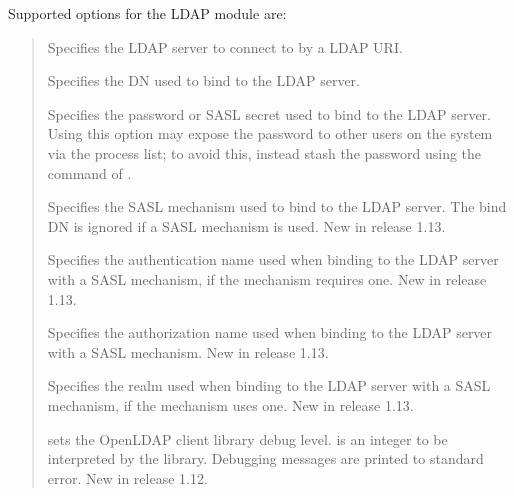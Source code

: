 \documentclass[letterpaper,10pt,english]{sphinxmanual}
\begin{document}
\sphinxAtStartPar
Supported options for the LDAP module are:
\begin{quote}
\begin{description}
\sphinxAtStartPar
Specifies the LDAP server to connect to by a LDAP URI.

\sphinxAtStartPar
Specifies the DN used to bind to the LDAP server.

\sphinxAtStartPar
Specifies the password or SASL secret used to bind to the LDAP
server.  Using this option may expose the password to other
users on the system via the process list; to avoid this,
instead stash the password using the  command of
{\hyperref[\detokenize{admin/admin_commands/kdb5_ldap_util:kdb5-ldap-util-8}]{}}.

\sphinxAtStartPar
Specifies the SASL mechanism used to bind to the LDAP server.
The bind DN is ignored if a SASL mechanism is used.  New in
release 1.13.

\sphinxAtStartPar
Specifies the authentication name used when binding to the
LDAP server with a SASL mechanism, if the mechanism requires
one.  New in release 1.13.

\sphinxAtStartPar
Specifies the authorization name used when binding to the LDAP
server with a SASL mechanism.  New in release 1.13.

\sphinxAtStartPar
Specifies the realm used when binding to the LDAP server with
a SASL mechanism, if the mechanism uses one.  New in release
1.13.

\sphinxAtStartPar
sets the OpenLDAP client library debug level.   is an
integer to be interpreted by the library.  Debugging messages
are printed to standard error.  New in release 1.12.

\end{description}
\end{quote}
\end{document}
